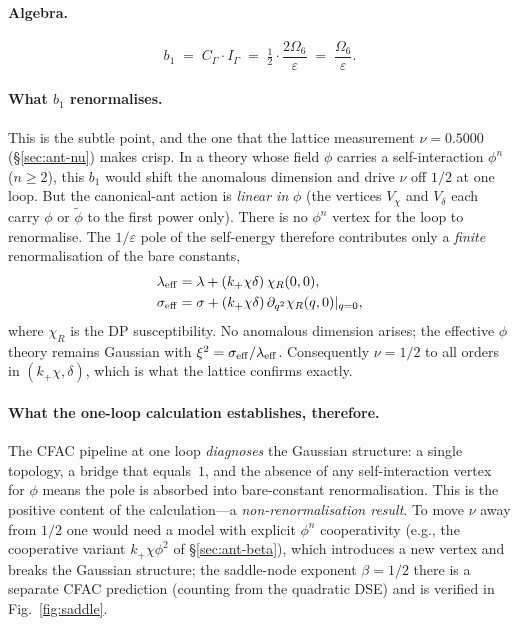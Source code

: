 \documentclass[10pt,a4paper,twocolumn]{article}
\newcommand{\phit}{\tilde\phi}
\theoremstyle{definition}
\begin{document}
\paragraph{Algebra.}
\begin{equation}
  b_1 \;=\; C_\Gamma \cdot I_\Gamma
      \;=\; \tfrac{1}{2} \cdot \frac{2\Omega_6}{\varepsilon}
      \;=\; \frac{\Omega_6}{\varepsilon}.
\end{equation}

\paragraph{What $b_1$ renormalises.}
This is the subtle point, and the one that the lattice
measurement $\nu = 0.5000$ (\S\ref{sec:ant-nu}) makes crisp.
In a theory whose field $\phi$ carries a self-interaction
$\phi^n$ ($n\geq 2$), this $b_1$ would shift the anomalous
dimension and drive $\nu$ off $1/2$ at one loop.  But the
canonical-ant action is \emph{linear in} $\phi$ (the vertices
$V_\chi$ and $V_\delta$ each carry $\phi$ or $\phit$ to the
first power only).  There is no $\phi^n$ vertex for the loop
to renormalise.  The $1/\varepsilon$ pole of the self-energy
therefore contributes only a \emph{finite} renormalisation of
the bare constants,
\begin{align}
  \lambda_{\rm eff} &= \lambda + (k_+\chi\delta)\,\chi_R(0,0), \\
  \sigma_{\rm eff}  &= \sigma + (k_+\chi\delta)\,
                       \partial_{q^2}\chi_R(q,0)|_{q=0},
\end{align}
where $\chi_R$ is the DP susceptibility.  No anomalous dimension
arises; the effective $\phi$ theory remains Gaussian with
$\xi^2 = \sigma_{\rm eff}/\lambda_{\rm eff}$.  Consequently
$\nu = 1/2$ to all orders in $(k_+\chi, \delta)$, which is what
the lattice confirms exactly.

\paragraph{What the one-loop calculation establishes, therefore.}
The CFAC pipeline at one loop \emph{diagnoses} the Gaussian
structure: a single topology, a bridge that equals~$1$, and the
absence of any self-interaction vertex for $\phi$ means the
pole is absorbed into bare-constant renormalisation.  This is
the positive content of the calculation---a
\emph{non-renormalisation result}.  To move $\nu$ away from
$1/2$ one would need a model with explicit $\phi^n$ cooperativity
(e.g., the cooperative variant $k_+\chi\phi^2$ of
\S\ref{sec:ant-beta}), which introduces a new vertex and breaks
the Gaussian structure; the saddle-node exponent $\beta = 1/2$
there is a separate CFAC prediction (counting from the quadratic
DSE) and is verified in Fig.~\ref{fig:saddle}.
\end{document}
